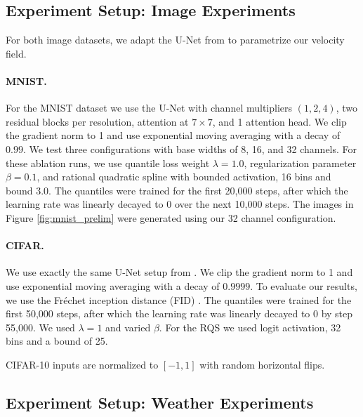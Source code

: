 \documentclass{article}
\theoremstyle{plain}
\theoremstyle{definition}
\theoremstyle{remark}
\begin{document}
\subsection{Experiment Setup: Image Experiments}
For both image datasets, we adapt the U-Net from \cite{nichol2021improved} to parametrize our velocity field.

\paragraph{MNIST.}
{For the MNIST dataset we use the U-Net with channel multipliers $(1,2,4)$, two residual blocks per resolution, attention at $7\times7$, and 1 attention head. We clip the gradient norm to 1 and use exponential moving averaging with a decay of $0.99$. We test three configurations with base widths of 8, 16, and 32 channels. For these ablation runs, we use quantile loss weight $\lambda = 1.0$, regularization parameter $\beta=0.1$, and rational quadratic spline with bounded activation, 16 bins and bound 3.0. The quantiles were trained for the first 20{,}000 steps, after which the learning rate was linearly decayed to 0 over the next 10{,}000 steps. The images in Figure \ref{fig:mnist_prelim} were generated using our 32 channel configuration.}

\paragraph{CIFAR.}
{We use exactly the same U-Net setup from \cite{tong2024improvinggeneralizingflowbasedgenerative}}. We clip the gradient norm to 1 and use exponential moving averaging with a decay of $0.9999$. To evaluate our results, we use the Fr\'echet inception distance (FID) \cite{HRUNH2017}. The quantiles were trained for the first 50{,}000 steps, after which the learning rate was linearly decayed to 0 by step 55{,}000. { We used $\lambda =1$ and varied $\beta$. For the RQS we used logit activation, 32 bins and a bound of 25.}

CIFAR-10 inputs are normalized to $[-1,1]$ with random horizontal flips.

\subsection{Experiment Setup: Weather Experiments}\label{subsec:Experiment Setup: Weather Experiments}
\end{document}
